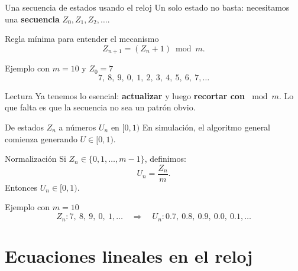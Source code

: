 \documentclass[aspectratio=1610, 9pt]{beamer}
\begin{document}
\begin{frame}{Una secuencia de estados usando el reloj}
    Un solo estado no basta: necesitamos una \textbf{secuencia} $Z_0,Z_1,Z_2,\dots$.

    \vspace{0.25cm}
    \begin{block}{Regla mínima para entender el mecanismo}
    \[
    Z_{n+1} = (Z_n+1)\bmod m.
    \]
    \end{block}

    \vspace{0.2cm}
    \begin{exampleblock}{Ejemplo con $m=10$ y $Z_0=7$}
        \[
        7,\ 8,\ 9,\ 0,\ 1,\ 2,\ 3,\ 4,\ 5,\ 6,\ 7,\dots
        \]
    \end{exampleblock}

    \vspace{0.2cm}
    \begin{alertblock}{Lectura}
    Ya tenemos lo esencial: \textbf{actualizar} y luego \textbf{recortar con $\bmod m$}.
    Lo que falta es que la secuencia no sea un patrón obvio.
    \end{alertblock}
\end{frame}

\begin{frame}{De estados $Z_n$ a números $U_n$ en $[0,1)$}
    En simulación, el algoritmo general comienza generando $U\in[0,1)$.

    \vspace{0.25cm}
    \begin{block}{Normalización}
    Si $Z_n\in\{0,1,\dots,m-1\}$, definimos:
    \[
    U_n=\frac{Z_n}{m}.
    \]
    Entonces $U_n\in[0,1)$.
    \end{block}

    \vspace{0.2cm}
    \begin{exampleblock}{Ejemplo con $m=10$}
        \[
        Z_n: 7,\ 8,\ 9,\ 0,\ 1,\dots
        \quad\Rightarrow\quad
        U_n: 0.7,\ 0.8,\ 0.9,\ 0.0,\ 0.1,\dots
        \]
    \end{exampleblock}
\end{frame}

\section{Ecuaciones lineales en el reloj}
\end{document}
